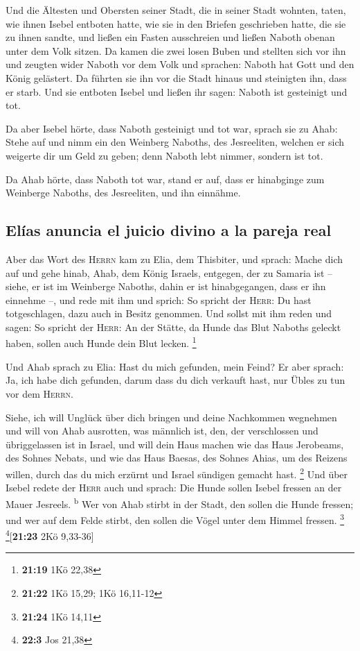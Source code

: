  Und die Ältesten und Obersten seiner Stadt, die in
seiner Stadt wohnten, taten, wie ihnen Isebel entboten hatte, wie sie in
den Briefen geschrieben hatte, die sie zu ihnen sandte, 
und ließen ein Fasten ausschreien und ließen Naboth obenan unter dem
Volk sitzen.  Da kamen die zwei losen Buben und stellten
sich vor ihn und zeugten wider Naboth vor dem Volk und sprachen: Naboth
hat Gott und den König gelästert. Da führten sie ihn vor die Stadt
hinaus und steinigten ihn, dass er starb.  Und sie
entboten Isebel und ließen ihr sagen: Naboth ist gesteinigt und tot.

 Da aber Isebel hörte, dass Naboth gesteinigt und tot
war, sprach sie zu Ahab: Stehe auf und nimm ein den Weinberg Naboths,
des Jesreeliten, welchen er sich weigerte dir um Geld zu geben; denn
Naboth lebt nimmer, sondern ist tot.

 Da Ahab hörte, dass Naboth tot war, stand er auf, dass
er hinabginge zum Weinberge Naboths, des Jesreeliten, und ihn einnähme.

\hypertarget{eluxedas-anuncia-el-juicio-divino-a-la-pareja-real}{%
\subsection{Elías anuncia el juicio divino a la pareja
real}\label{eluxedas-anuncia-el-juicio-divino-a-la-pareja-real}}

 Aber das Wort des \textsc{Herrn} kam zu Elia, dem
Thisbiter, und sprach:  Mache dich auf und gehe hinab,
Ahab, dem König Israels, entgegen, der zu Samaria ist -- siehe, er ist
im Weinberge Naboths, dahin er ist hinabgegangen, dass er ihn einnehme
--,  und rede mit ihm und sprich: So spricht der
\textsc{Herr}: Du hast totgeschlagen, dazu auch in Besitz genommen. Und
sollst mit ihm reden und sagen: So spricht der \textsc{Herr}: An der
Stätte, da Hunde das Blut Naboths geleckt haben, sollen auch Hunde dein
Blut lecken. \footnote{\textbf{21:19} 1Kö 22,38}

 Und Ahab sprach zu Elia: Hast du mich gefunden, mein
Feind? Er aber sprach: Ja, ich habe dich gefunden, darum dass du dich
verkauft hast, nur Übles zu tun vor dem \textsc{Herrn}.

 Siehe, ich will Unglück über dich bringen und deine
Nachkommen wegnehmen und will von Ahab ausrotten, was männlich ist, den,
der verschlossen und übriggelassen ist in Israel,  und
will dein Haus machen wie das Haus Jerobeams, des Sohnes Nebats, und wie
das Haus Baesas, des Sohnes Ahias, um des Reizens willen, durch das du
mich erzürnt und Israel sündigen gemacht hast. \footnote{\textbf{21:22}
  1Kö 15,29; 1Kö 16,11-12}  Und über Isebel redete der
\textsc{Herr} auch und sprach: Die Hunde sollen Isebel fressen an der
Mauer Jesreels. \textsuperscript{b}  Wer von Ahab stirbt
in der Stadt, den sollen die Hunde fressen; und wer auf dem Felde
stirbt, den sollen die Vögel unter dem Himmel fressen. \footnote{\textbf{21:24}
  1Kö 14,11} \footnote{\textbf{22:3} Jos 21,38}{[}\textbf{21:23} 2Kö
9,33-36{]}

